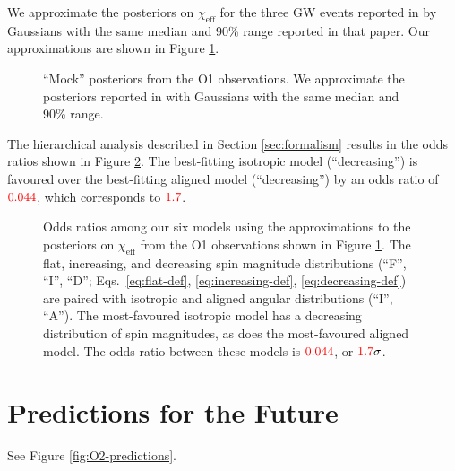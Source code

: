 \documentclass[modern]{aastex61}
\newcommand{\chieff}{\chi_\mathrm{eff}}
\newcommand{\checkme}[1]{\textcolor{red}{#1}}
\newcommand{\OOneSigmaIsoAligned}{\checkme{1.7}}
\newcommand{\OOneOddsIsoAligned}{\checkme{0.044}}
\begin{document}
We approximate the posteriors on $\chieff$ for the three \ac{GW}
events reported in \cite{O1-BBH} by Gaussians with the same median and
90\% range reported in that paper.  Our approximations are shown in
Figure \ref{fig:O1-posteriors}.

\begin{figure}
  \caption{\label{fig:O1-posteriors} ``Mock'' posteriors from the O1
    observations.  We approximate the posteriors reported in
    \citet{O1-BBH} with Gaussians with the same median and 90\%
    range.}
\end{figure}

The hierarchical analysis described in Section \ref{sec:formalism}
results in the odds ratios shown in Figure \ref{fig:O1-odds}.  The
best-fitting isotropic model (``decreasing'') is favoured over the
best-fitting aligned model (``decreasing'') by an odds ratio of
$\OOneOddsIsoAligned$, which corresponds to $\OOneSigmaIsoAligned$.

\begin{figure}
  \caption{Odds ratios among our six models using the approximations
    to the posteriors on $\chieff$ from the O1 observations shown in
    Figure \ref{fig:O1-posteriors}.  The flat, increasing, and
    decreasing spin magnitude distributions (``F'', ``I'', ``D'';
    Eqs.\ \eqref{eq:flat-def}, \eqref{eq:increasing-def},
    \eqref{eq:decreasing-def}) are paired with isotropic and aligned
    angular distributions (``I'', ``A'').  The most-favoured isotropic
    model has a decreasing distribution of spin magnitudes, as does
    the most-favoured aligned model.  The odds ratio between these
    models is $\OOneOddsIsoAligned$, or $\OOneSigmaIsoAligned\sigma$.}
  \label{fig:O1-odds}
\end{figure}

\section{Predictions for the Future}

See Figure \ref{fig:O2-predictions}.
\end{document}
